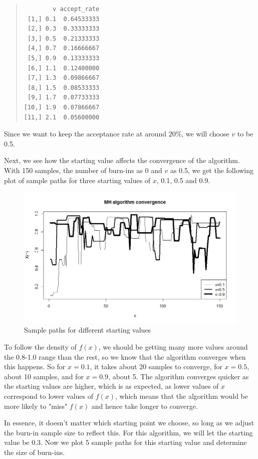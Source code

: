 \documentclass[11pt, a4paper]{article}
\begin{document}
\begin{quote}
\begin{verbatim}
        v accept_rate
 [1,] 0.1  0.64533333
 [2,] 0.3  0.33333333
 [3,] 0.5  0.21333333
 [4,] 0.7  0.16666667
 [5,] 0.9  0.13333333
 [6,] 1.1  0.12400000
 [7,] 1.3  0.09866667
 [8,] 1.5  0.08533333
 [9,] 1.7  0.07733333
[10,] 1.9  0.07866667
[11,] 2.1  0.05600000
\end{verbatim}
\end{quote}

Since we want to keep the acceptance rate at around 20\%, we will choose $v$ to be 0.5.

Next, we see how the starting value affects the convergence of the algorithm. With 150 samples, the number of burn-ins as 0 and $v$ as 0.5, we get the following plot of sample paths for three starting values of $x$, 0.1, 0.5 and 0.9.

\begin{figure}[H]
\centering
	\includegraphics[scale=0.4]{3conv.jpeg}
\caption{Sample paths for different starting values}
\end{figure}

To follow the density of $f(x)$, we should be getting many more values around the 0.8-1.0 range than the rest, so we know that the algorithm converges when this happens. So for $x=0.1$, it takes about 20 samples to converge, for $x=0.5$, about 10 samples, and for $x=0.9$, about 5. The algorithm converges quicker as the starting values are higher, which is as expected, as lower values of $x$ correspond to lower values of $f(x)$, which means that the algorithm would be more likely to "miss" $f(x)$ and hence take longer to converge.

In essence, it doesn't matter which starting point we choose, so long as we adjust the burn-in sample size to reflect this. For this algorithm, we will let the starting value be 0.3. Now we plot 5 sample paths for this starting value and determine the size of burn-ins.
\end{document}
